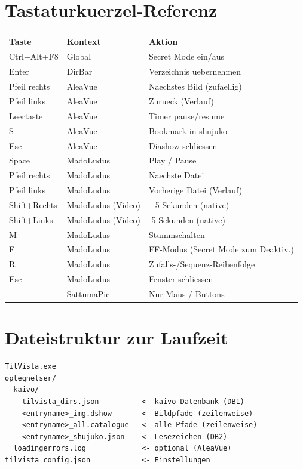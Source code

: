 \documentclass[
  12pt,
  a4paper,
  twoside,
  headings=normal,
  parskip=half
]{scrreprt}
\begin{document}
\chapter{Tastaturkuerzel-Referenz}

\begin{longtable}{p{4.5cm}p{3cm}p{6cm}}
\toprule
\textbf{Taste} & \textbf{Kontext} & \textbf{Aktion} \\
\midrule
\endfirsthead
\midrule
\endfirsthead
\midrule
\endhead
Ctrl+Alt+F8    & Global        & Secret Mode ein/aus \\
Enter          & DirBar        & Verzeichnis uebernehmen \\
\midrule
Pfeil rechts   & AleaVue       & Naechstes Bild (zufaellig) \\
Pfeil links    & AleaVue       & Zurueck (Verlauf) \\
Leertaste      & AleaVue       & Timer pause/resume \\
S              & AleaVue       & Bookmark in shujuko \\
Esc            & AleaVue       & Diashow schliessen \\
\midrule
Space          & MadoLudus     & Play / Pause \\
Pfeil rechts   & MadoLudus     & Naechste Datei \\
Pfeil links    & MadoLudus     & Vorherige Datei (Verlauf) \\
Shift+Rechts   & MadoLudus (Video) & +5 Sekunden (native) \\
Shift+Links    & MadoLudus (Video) & -5 Sekunden (native) \\
M              & MadoLudus     & Stummschalten \\
F              & MadoLudus     & FF-Modus (Secret Mode zum Deaktiv.) \\
R              & MadoLudus     & Zufalls-/Sequenz-Reihenfolge \\
Esc            & MadoLudus     & Fenster schliessen \\
\midrule
{--}           & SattumaPic    & Nur Maus / Buttons \\
\bottomrule
\end{longtable}

\chapter{Dateistruktur zur Laufzeit}

\begin{lstlisting}[language={}, numbers=none,
  caption={Laufzeitverzeichnis neben der .exe}]
TilVista.exe
optegnelser/
  kaivo/
    tilvista_dirs.json          <- kaivo-Datenbank (DB1)
    <entryname>_img.dshow       <- Bildpfade (zeilenweise)
    <entryname>_all.catalogue   <- alle Pfade (zeilenweise)
    <entryname>_shujuko.json    <- Lesezeichen (DB2)
  loadingerrors.log             <- optional (AleaVue)
tilvista_config.json            <- Einstellungen
\end{lstlisting}

\printindex
\end{document}
